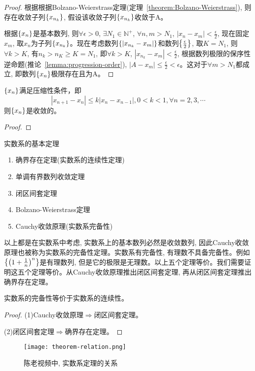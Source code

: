 \begin{proof}
根据根据Bolzano-Weierstrass定理(定理~\ref{theorem:Bolzano-Weierstrass}), 则存在收敛子列$\left\{ x_{n_k}\right\}$, 假设该收敛子列$\left\{ x_{n_k}\right\}$收敛于A。

根据$\left\{ x_n\right\}$是基本数列, 则$\forall \epsilon > 0$, $\exists N_1 \in \mathbb{N}^+$, $\forall n, m > N_1$, $\left| x_n - x_m \right| < \frac{\epsilon}{2}$, 现在固定$x_m$, 取$x_n$为子列$\left\{ x_{n_k}\right\}$。现在考虑数列$\left\{ \left| x_{n_k}  - x_m\right|\right\}$和数列$\left\{ \frac{\epsilon}{2}\right\}$, 取$K = N_1$, 则$\forall k > K$, 有$n_k > n_K \ge K = N_1$, 即$\forall k > K$, $\left| x_{n_k}  - x_m\right| < \frac{\epsilon}{2}$, 根据数列极限的保序性逆命题(推论~\ref{lemma:progression-order}), $\left| A - x_m\right| \le \frac{\epsilon}{2} < \epsilon$。这对于$\forall m > N_1$都成立, 即数列$\left\{ x_n\right\}$极限存在且为A。
\end{proof}

\begin{proposition}
    $\left\{ x_n\right\}$满足压缩性条件，即
    \[ \left| x_{n+1} -x_n \right| \le k\left| x_n - x_{n-1}\right|, 0 < k < 1, \forall n = 2, 3, \cdots \] 
    则$\left\{ x_n\right\}$是收敛的。
\end{proposition}
\begin{proof}

\end{proof}

实数系的基本定理
\begin{enumerate}
    \item 确界存在定理(实数系的连续性定理)
    \item 单调有界数列收敛定理
    \item 闭区间套定理
    \item Bolzano-Weierstrass定理
    \item Cauchy收敛原理(实数系完备性)
\end{enumerate}
以上都是在实数系中考虑, 实数系上的基本数列必然是收敛数列, 因此Cauchy收敛原理也被称为实数系的完备性定理。实数系有完备性, 有理数不具备完备性。例如$\left\{ \left( 1 + \frac{1}{n}\right)^n\right\}$是有理数列, 但是它的极限是无理数。以上五个定理等价。我们需要证明这五个定理等价。从Cauchy收敛原理推出闭区间套定理, 再从闭区间套定理推出确界存在定理。
\begin{theorem}
    实数系的完备性等价于实数系的连续性。
\end{theorem}
\begin{proof}
    (1)Cauchy收敛原理$\Rightarrow$闭区间套定理。

    (2)闭区间套定理$\Rightarrow$确界存在定理。
\end{proof}
\begin{figure}[htbp]
    \centering
    \texttt{[image: theorem-relation.png]}
    \caption{陈老视频中, 实数系定理的关系}
\end{figure}